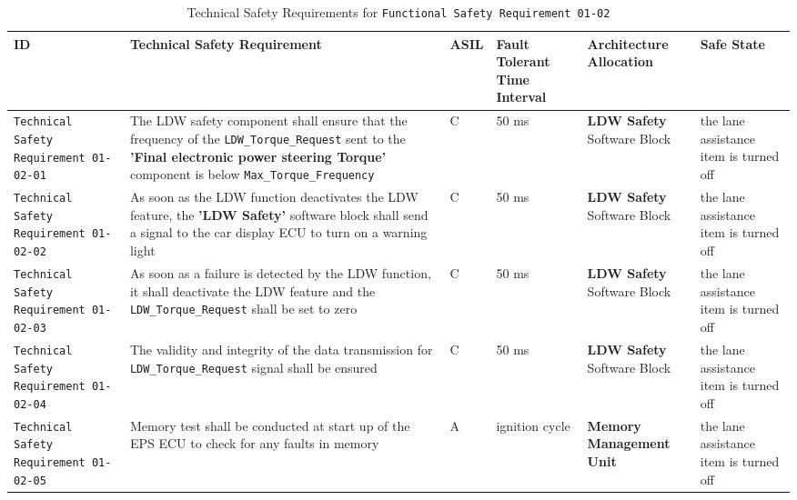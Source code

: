 \begin{table}[!htpb]
\caption{Technical Safety Requirements for
  \textcolor{dark-green}{\texttt{Functional Safety Requirement 01-02}}}
\begin{center}
\scriptsize
\renewcommand{\arraystretch}{1.4}
\begin{tabular}{ L{1.8cm}|L{5.2cm}|L{0.7cm}|L{1.3cm}|L{1.8cm}|L{2.0cm}  }
\hline
{}
ID &
Technical Safety Requirement  &
ASIL &
Fault Tolerant Time Interval  &  
Architecture Allocation  &  
Safe State \\\hline
\textcolor{harmonia-blue}{\texttt{Technical Safety Requirement 01-02-01}}  &
The LDW safety component shall ensure that the frequency of the 
  \textcolor{dark-red}{\texttt{LDW\_Torque\_Request}}
  sent to the 
  \textbf{'Final electronic power steering Torque'} component is below 
  \textcolor{dark-red}{\texttt{Max\_Torque\_Frequency}} &
C &
50 ms  &
  \textbf{LDW Safety} Software Block  &
the lane assistance item is turned off 
\\\hline
\textcolor{harmonia-blue}{\texttt{Technical Safety Requirement 01-02-02}}  &
As soon as the LDW function deactivates the LDW feature, the 
  \textbf{'LDW Safety'}
  software block shall send a signal to the car display ECU to turn on a
  warning light&
C &
50 ms  &
  \textbf{LDW Safety} Software Block  &
the lane assistance item is turned off 
\\\hline
\textcolor{harmonia-blue}{\texttt{Technical Safety Requirement 01-02-03}}  &
As soon as a failure is detected by the LDW function, it shall deactivate the
  LDW feature and the 
  \textcolor{dark-red}{\texttt{LDW\_Torque\_Request}} shall be set to zero &
C &
50 ms  &
  \textbf{LDW Safety} Software Block  &
the lane assistance item is turned off 
\\\hline
\textcolor{harmonia-blue}{\texttt{Technical Safety Requirement 01-02-04}}  &
The validity and integrity of the data transmission for 
  \textcolor{dark-red}{\texttt{LDW\_Torque\_Request}}
  signal shall be ensured &
C &
50 ms  &
  \textbf{LDW Safety} Software Block  &
the lane assistance item is turned off 
\\\hline
\textcolor{harmonia-blue}{\texttt{Technical Safety Requirement 01-02-05}}  &
Memory test shall be conducted at start up of the EPS ECU to check for any
  faults in memory &
A &
ignition cycle  &
  \textbf{Memory Management Unit}   &
the lane assistance item is turned off 
\\\hline
\end{tabular}
\end{center}
\label{tab:tr0102}
\end{table}


